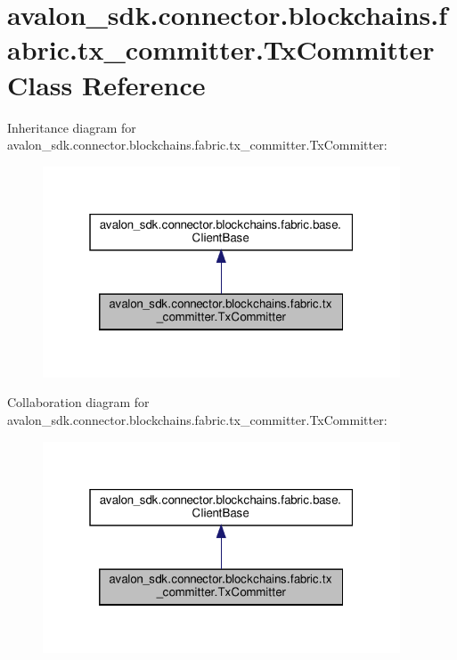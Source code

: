 \hypertarget{classavalon__sdk_1_1connector_1_1blockchains_1_1fabric_1_1tx__committer_1_1TxCommitter}{}\section{avalon\+\_\+sdk.\+connector.\+blockchains.\+fabric.\+tx\+\_\+committer.\+Tx\+Committer Class Reference}
\label{classavalon__sdk_1_1connector_1_1blockchains_1_1fabric_1_1tx__committer_1_1TxCommitter}


Inheritance diagram for avalon\+\_\+sdk.\+connector.\+blockchains.\+fabric.\+tx\+\_\+committer.\+Tx\+Committer\+:
\nopagebreak
\begin{figure}[H]
\begin{center}
\leavevmode
\includegraphics[width=301pt]{classavalon__sdk_1_1connector_1_1blockchains_1_1fabric_1_1tx__committer_1_1TxCommitter__inherit__graph}
\end{center}
\end{figure}


Collaboration diagram for avalon\+\_\+sdk.\+connector.\+blockchains.\+fabric.\+tx\+\_\+committer.\+Tx\+Committer\+:
\nopagebreak
\begin{figure}[H]
\begin{center}
\leavevmode
\includegraphics[width=301pt]{classavalon__sdk_1_1connector_1_1blockchains_1_1fabric_1_1tx__committer_1_1TxCommitter__coll__graph}
\end{center}
\end{figure}
